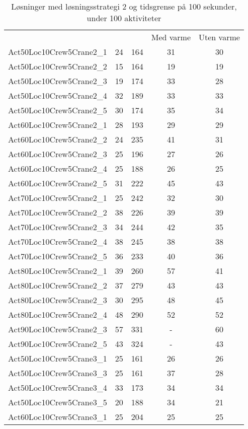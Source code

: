 \begin{center}										
\begin{longtable}{ | l | c | c | c | c | }
\caption{Løsninger med løsningsstrategi 2 og tidsgrense på 100 sekunder, under 100 aktiviteter}										
\hline										
	&		&		&	Med varme	&	Uten varme	\\
Act50Loc10Crew5Crane2\_1	&	24	&	164	&	31	&	30	\\
Act50Loc10Crew5Crane2\_2	&	15	&	164	&	19	&	19	\\
Act50Loc10Crew5Crane2\_3	&	19	&	174	&	33	&	28	\\
Act50Loc10Crew5Crane2\_4	&	32	&	189	&	33	&	33	\\
Act50Loc10Crew5Crane2\_5	&	30	&	174	&	35	&	34	\\
Act60Loc10Crew5Crane2\_1	&	28	&	193	&	29	&	29	\\
Act60Loc10Crew5Crane2\_2	&	24	&	235	&	41	&	31	\\
Act60Loc10Crew5Crane2\_3	&	25	&	196	&	27	&	26	\\
Act60Loc10Crew5Crane2\_4	&	25	&	188	&	26	&	25	\\
Act60Loc10Crew5Crane2\_5	&	31	&	222	&	45	&	43	\\
Act70Loc10Crew5Crane2\_1	&	25	&	242	&	32	&	30	\\
Act70Loc10Crew5Crane2\_2	&	38	&	226	&	39	&	39	\\
Act70Loc10Crew5Crane2\_3	&	34	&	244	&	42	&	35	\\
Act70Loc10Crew5Crane2\_4	&	38	&	245	&	38	&	38	\\
Act70Loc10Crew5Crane2\_5	&	36	&	233	&	40	&	36	\\
Act80Loc10Crew5Crane2\_1	&	39	&	260	&	57	&	41	\\
Act80Loc10Crew5Crane2\_2	&	37	&	279	&	43	&	43	\\
Act80Loc10Crew5Crane2\_3	&	30	&	295	&	48	&	45	\\
Act80Loc10Crew5Crane2\_4	&	48	&	290	&	52	&	52	\\
Act90Loc10Crew5Crane2\_3	&	57	&	331	&	-	&	60	\\
Act90Loc10Crew5Crane2\_5	&	43	&	324	&	-	&	43	\\ \hline
Act50Loc10Crew5Crane3\_1	&	25	&	161	&	26	&	26	\\
Act50Loc10Crew5Crane3\_3	&	25	&	161	&	37	&	28	\\
Act50Loc10Crew5Crane3\_4	&	33	&	173	&	34	&	34	\\
Act50Loc10Crew5Crane3\_5	&	20	&	188	&	34	&	21	\\
Act60Loc10Crew5Crane3\_1	&	25	&	204	&	25	&	25	\\

\end{longtable}
\end{center}
